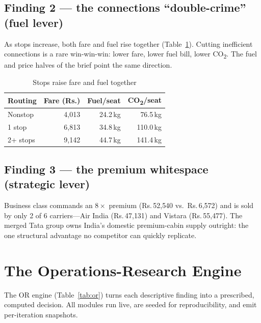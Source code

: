 \documentclass[conference]{IEEEtran}
\newcommand{\INR}{\mbox{Rs.}}
\newcommand{\co}{\mbox{CO\textsubscript{2}}}
\begin{document}
\subsection{Finding 2 --- the connections ``double-crime'' (fuel lever)}
As stops increase, both fare and fuel rise together (Table~\ref{tab:stops}). Cutting inefficient connections is a rare win-win-win: lower fare, lower fuel bill, lower \co{}. The fuel and price halves of the brief point the same direction.

\begin{table}[!t]
\caption{Stops raise fare and fuel together}
\label{tab:stops}
\centering
\renewcommand{\arraystretch}{1.1}
\begin{tabular}{@{}lrrr@{}}
\toprule
\textbf{Routing} & \textbf{Fare (\INR{})} & \textbf{Fuel/seat} & \textbf{\co{}/seat}\\
\midrule
Nonstop & 4{,}013 & 24.2\,kg & 76.5\,kg\\
1 stop & 6{,}813 & 34.8\,kg & 110.0\,kg\\
2+ stops & 9{,}142 & 44.7\,kg & 141.4\,kg\\
\bottomrule
\end{tabular}
\end{table}

\subsection{Finding 3 --- the premium whitespace (strategic lever)}
Business class commands an $8\times$ premium (\INR{}\,52{,}540 vs.\ \INR{}\,6{,}572) and is sold by only 2 of 6 carriers---Air India (\INR{}\,47{,}131) and Vistara (\INR{}\,55{,}477). The merged Tata group owns India's domestic premium-cabin supply outright: the one structural advantage no competitor can quickly replicate.

\section{The Operations-Research Engine}
The OR engine (Table~\ref{tab:or}) turns each descriptive finding into a prescribed, computed decision. All modules run live, are seeded for reproducibility, and emit per-iteration snapshots.
\end{document}
